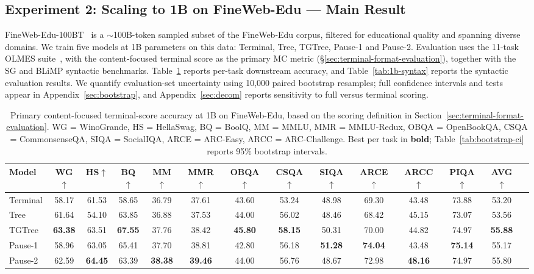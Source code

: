 \documentclass[11pt]{article}
\begin{document}
\subsection{Experiment 2: Scaling to 1B on FineWeb-Edu --- Main Result}
\label{sec:exp2}

FineWeb-Edu-100BT~\cite{penedo2024fineweb} is a $\sim$100B-token sampled subset of the FineWeb-Edu corpus, filtered for educational quality and spanning diverse domains.
We train five models at 1B parameters on this data: Terminal, Tree, TGTree, Pause-1 and Pause-2.
Evaluation uses the 11-task OLMES suite~\cite{gu-etal-2025-olmes}, with the content-focused terminal score as the primary MC metric (\S\ref{sec:terminal-format-evaluation}), together with the SG and BLiMP syntactic benchmarks. Table~\ref{tab:main-result} reports per-task downstream accuracy, and Table~\ref{tab:1b-syntax} reports the syntactic evaluation results. We quantify evaluation-set uncertainty using 10,000 paired bootstrap resamples; full confidence intervals and tests appear in Appendix~\ref{sec:bootstrap}, and Appendix~\ref{sec:decom} reports sensitivity to full versus terminal scoring.

\begin{table}[htbp]
  \centering
  \setlength{\tabcolsep}{1.5pt}
  \begin{tabular}{lccccccccccccc}
    \toprule
    Model & WG$\uparrow$ & HS$\uparrow$ & BQ$\uparrow$ & MM$\uparrow$ & MMR$\uparrow$ & OBQA$\uparrow$ & CSQA$\uparrow$ & SIQA$\uparrow$ & ARCE$\uparrow$ & ARCC$\uparrow$ & PIQA$\uparrow$ & \textbf{AVG}$\uparrow$ \\
    \midrule
    Terminal & 58.17 & 61.53 & 58.65 & 36.79 & 37.61 & 43.60 & 53.24 & 48.98 & 69.30 & 43.48 & 73.88 & 53.20 \\
    Tree & 61.64 & 54.10 & 63.85 & 36.88 & 37.53 & 44.00 & 56.02 & 48.46 & 68.42 & 45.15 & 73.07 & 53.56 \\
    TGTree & \textbf{63.38} & 63.51 & \textbf{67.55} & 37.76 & 38.42 & \textbf{45.80} & \textbf{58.15} & 50.31 & 70.00 & 44.82 & 74.97 & \textbf{55.88} \\
    Pause-1 & 58.96 & 63.05 & 65.41 & 37.70 & 38.81 & 42.80 & 56.18 & \textbf{51.28} & \textbf{74.04} & 43.48 & \textbf{75.14} & 55.17 \\
    Pause-2 & 62.59 & \textbf{64.45} & 63.39 & \textbf{38.38} & \textbf{39.46} & 44.00 & 56.76 & 48.67 & 72.98 & \textbf{48.16} & 74.97 & 55.80 \\
    \bottomrule
  \end{tabular}
  \caption{Primary content-focused terminal-score accuracy at 1B on FineWeb-Edu, based on the scoring definition in Section~\ref{sec:terminal-format-evaluation}. WG = WinoGrande, HS = HellaSwag, BQ = BoolQ, MM = MMLU, MMR = MMLU-Redux, OBQA = OpenBookQA, CSQA = CommonsenseQA, SIQA = SocialIQA, ARCE = ARC-Easy, ARCC = ARC-Challenge. Best per task in \textbf{bold}; Table~\ref{tab:bootstrap-ci} reports 95\% bootstrap intervals.}
  \label{tab:main-result}
\end{table}
\end{document}
